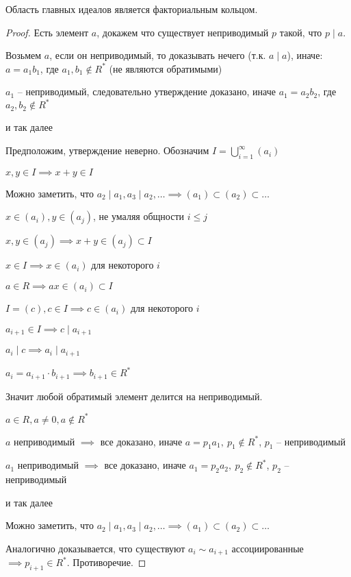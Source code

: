 \begin{theorem}
    Область главных идеалов является факториальным кольцом.
\end{theorem}

\begin{proof}
    Есть элемент $a$, докажем что существует неприводимый $p$ такой, что $p \mid a$.

    Возьмем $a$, если он неприводимый, то доказывать нечего (т.к. $a \mid a$), иначе: $a = a_1 b_1$, где $a_1, b_1 \notin R^*$ (не являются обратимыми)

    $a_1$ -- неприводимый, следовательно утверждение доказано, иначе $a_1 = a_2 b_2$, где $a_2, b_2 \notin R^*$

    и так далее

    Предположим, утверждение неверно. Обозначим $I = \bigcup\limits_{i = 1}^{\infty} (a_i)$

    $x, y \in I \implies x + y \in I$

    Можно заметить, что  $a_2 \mid a_1, a_3 \mid a_2, \ldots \implies (a_1) \subset (a_2) \subset \ldots$

    $x \in (a_i), y \in (a_j)$, не умаляя общности $i \leq j$

    $x, y \in (a_j) \implies x+y \in (a_j) \subset I$

    $x \in I \implies x \in (a_i)$ для некоторого $i$

    $a \in R \implies ax \in (a_i) \subset I$

    $I = (c), c \in I \implies c \in (a_i)$ для некоторого $i$

    $a_{i+1} \in I \implies c \mid a_{i+1}$

    $a_i \mid c \implies a_i \mid a_{i+1}$

    $a_i = a_{i + 1} \cdot b_{i + 1} \implies b_{i + 1} \in R^*$ 

    Значит любой обратимый элемент делится на неприводимый.

    $a \in R, a \neq 0, a \notin R^*$

    $a$ неприводимый $\implies$ все доказано, иначе $a = p_1 a_1,~p_1 \notin R^*$, $p_1$ -- неприводимый

    $a_1$ неприводимый $\implies$ все доказано, иначе $a_1 = p_2 a_2,~p_2 \notin R^*$, $p_2$ -- неприводимый

    и так далее

    Можно заметить, что  $a_2 \mid a_1, a_3 \mid a_2, \ldots \implies (a_1) \subset (a_2) \subset \ldots$

    Аналогично доказывается, что существуют $a_i \sim a_{i + 1}$ ассоциированные $\implies p_{i + 1} \in R^*$. Противоречие.


\end{proof}
